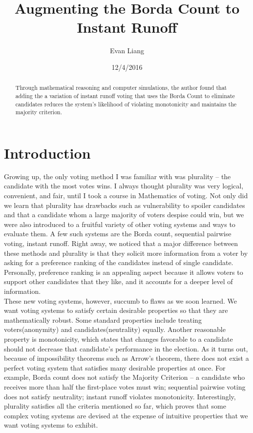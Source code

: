 \documentclass{article}
\title{Augmenting the Borda Count to Instant Runoff}
\date{12/4/2016}
\author{Evan Liang}
\begin{document}
	\maketitle
\begin{abstract}
	Through mathematical reasoning and computer simulations, the author found that adding the a variation of instant runoff voting that uses the Borda Count to eliminate candidates reduces the system's likelihood of violating monotonicity and maintains the majority criterion.
\end{abstract}
\section{Introduction}

Growing up, the only voting method I was familiar with was plurality – the candidate with the most votes wins. I always thought plurality was very logical, convenient, and fair, until I took a course in Mathematics of voting. Not only did we learn that plurality has drawbacks such as vulnerability to spoiler candidates and that a candidate whom a large majority of voters despise could win, but we were also introduced to a fruitful variety of other voting systems and ways to evaluate them. A few such systems are the Borda count, sequential pairwise voting, instant runoff. Right away, we noticed that a major difference between these methods and plurality is that they solicit more information from a voter by asking for a preference ranking of the candidates instead of single candidate. Personally, preference ranking is an appealing aspect because it allows voters to support other candidates that they like, and it accounts for a deeper level of information. \\


These new voting systems, however, succumb to flaws as we soon learned. We want voting systems to satisfy certain desirable properties so that they are mathematically robust. Some standard properties include treating voters(anonymity) and candidates(neutrality) equally. Another reasonable property is monotonicity, which states that changes favorable to a candidate should not decrease that candidate’s performance in the election. As it turns out, because of impossibility theorems such as Arrow’s theorem, there does not exist a perfect voting system that satisfies many desirable properties at once. For example, Borda count does not satisfy the Majority Criterion – a candidate who receives more than half the first-place votes must win; sequential pairwise voting does not satisfy neutrality; instant runoff violates monotonicity. Interestingly, plurality satisfies all the criteria mentioned so far, which proves that some complex voting systems are devised at the expense of intuitive properties that we want voting systems to exhibit. \\ 
\end{document}
